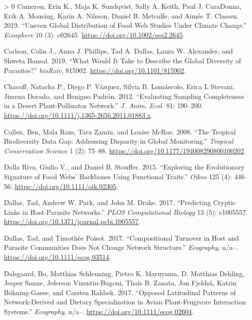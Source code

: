\documentclass[10pt,oneside]{article}
\newlength{\cslhangindent}
\newenvironment{CSLReferences}[3] %
 {%
  \setlength{\parindent}{0pt}
  \ifodd #1 \everypar{\setlength{\hangindent}{\cslhangindent}}\ignorespaces\fi
  \ifnum #2 > 0
  \setlength{\parskip}{#2\baselineskip}
  \fi
 }%
 {}
\begin{document}
\begin{CSLReferences}{1}{0}
\leavevmode\hypertarget{ref-Cameron2019UneGlo}{}%
Cameron, Erin K., Maja K. Sundqvist, Sally A. Keith, Paul J. CaraDonna,
Erik A. Mousing, Karin A. Nilsson, Daniel B. Metcalfe, and Aimée T.
Classen. 2019. {``Uneven Global Distribution of Food Web Studies Under
Climate Change.''} \emph{Ecosphere} 10 (3): e02645.
\url{https://doi.org/10.1002/ecs2.2645}.

\leavevmode\hypertarget{ref-Carlson2019WhaWou}{}%
Carlson, Colin J., Anna J. Phillips, Tad A. Dallas, Laura W. Alexander,
and Shweta Bansal. 2019. {``What Would It Take to Describe the Global
Diversity of Parasites?''} \emph{bioRxiv}, 815902.
\url{https://doi.org/10.1101/815902}.

\leavevmode\hypertarget{ref-Chacoff2012EvaSam}{}%
Chacoff, Natacha P., Diego P. Vázquez, Silvia B. Lomáscolo, Erica L
Stevani, Jimena Dorado, and Benigno Padrón. 2012. {``Evaluating Sampling
Completeness in a Desert Plant-Pollinator Network.''} \emph{J. Anim.
Ecol.} 81: 190--200.
\url{https://doi.org/10.1111/j.1365-2656.2011.01883.x}.

\leavevmode\hypertarget{ref-Collen2008TroBio}{}%
Collen, Ben, Mala Ram, Tara Zamin, and Louise McRae. 2008. {``The
Tropical Biodiversity Data Gap: Addressing Disparity in Global
Monitoring.''} \emph{Tropical Conservation Science} 1 (2): 75--88.
\url{https://doi.org/10.1177/194008290800100202}.

\leavevmode\hypertarget{ref-DallaRiva2015ExpEvo}{}%
Dalla Riva, Giulio V., and Daniel B. Stouffer. 2015. {``Exploring the
Evolutionary Signature of Food Webs' Backbones Using Functional
Traits.''} \emph{Oikos} 125 (4): 446--56.
\url{https://doi.org/10.1111/oik.02305}.

\leavevmode\hypertarget{ref-Dallas2017PreCry}{}%
Dallas, Tad, Andrew W. Park, and John M. Drake. 2017. {``Predicting
Cryptic Links in Host-Parasite Networks.''} \emph{PLOS Computational
Biology} 13 (5): e1005557.
\url{https://doi.org/10.1371/journal.pcbi.1005557}.

\leavevmode\hypertarget{ref-Dallas2017ComTur}{}%
Dallas, Tad, and Timothée Poisot. 2017. {``Compositional Turnover in
Host and Parasite Communities Does Not Change Network Structure.''}
\emph{Ecography}, n/a--. \url{https://doi.org/10.1111/ecog.03514}.

\leavevmode\hypertarget{ref-Dalsgaard2017OppLat}{}%
Dalsgaard, Bo, Matthias Schleuning, Pietro K. Maruyama, D. Matthias
Dehling, Jesper Sonne, Jeferson Vizentin-Bugoni, Thais B. Zanata, Jon
Fjeldså, Katrin Böhning-Gaese, and Carsten Rahbek. 2017. {``Opposed
Latitudinal Patterns of Network-Derived and Dietary Specialization in
Avian Plant-Frugivore Interaction Systems.''} \emph{Ecography}, n/a--.
\url{https://doi.org/10.1111/ecog.02604}.


\end{CSLReferences}
\end{document}
